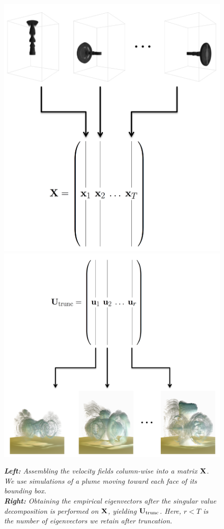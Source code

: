 \documentclass[11pt]{article}
\begin{document}
\begin{figure}
		\centering
		\includegraphics[height=0.45\textwidth]{Figures/plume_inverted_training.png}
		\includegraphics[height=0.45\textwidth]{Figures/U_trunc_invert.png}
		\caption{{\em{\bf Left:} Assembling the velocity fields column-wise into a matrix $\mathbf{X}$. We use simulations of a plume moving toward each face of its bounding box.}\\{\em{\bf Right:} Obtaining the empirical eigenvectors after the singular value decomposition is performed on $\mathbf{X}$, yielding $\mathbf{U}_{\textnormal{trunc}}$. Here, $r<T$ is the number of eigenvectors we retain after truncation.}}
		\label{fig:matrices}
\end{figure}
	
\end{document}

